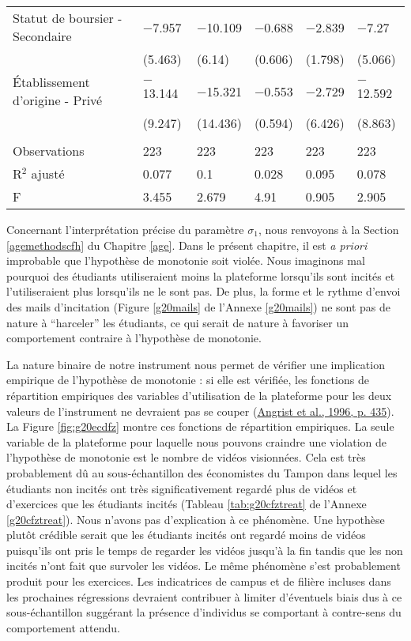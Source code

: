 \documentclass[
]{book}
\begin{document}
\begin{landscape}
\begin{ThreePartTable}
\begin{longtable}[t]{llllll}
Statut de boursier - Secondaire & $-$7.957 & $-$10.109 & $-$0.688 & $-$2.839 & $-$7.27\\
 & (5.463) & (6.14) & (0.606) & (1.798) & (5.066)\\
Établissement d'origine - Privé & $-$13.144 & $-$15.321 & $-$0.553 & $-$2.729 & $-$12.592\\
 & (9.247) & (14.436) & (0.594) & (6.426) & (8.863)\\
 &  &  &  &  & \\
Observations & 223 & 223 & 223 & 223 & 223\\
R$^2$ ajusté & 0.077 & 0.1 & 0.028 & 0.095 & 0.078\\
F & 3.455 & 2.679 & 4.91 & 0.905 & 2.905\\*
\end{longtable}
\end{ThreePartTable}
\endgroup{}
\end{landscape}

Concernant l'interprétation précise du paramètre \(\sigma_1\), nous renvoyons à la Section \ref{agemethodscfh} du Chapitre \ref{age}. Dans le présent chapitre, il est \emph{a priori} improbable que l'hypothèse de monotonie soit violée. Nous imaginons mal pourquoi des étudiants utiliseraient moins la plateforme lorsqu'ils sont incités et l'utiliseraient plus lorsqu'ils ne le sont pas. De plus, la forme et le rythme d'envoi des mails d'incitation (Figure \ref{g20mails} de l'Annexe \ref{g20mails}) ne sont pas de nature à ``harceler'' les étudiants, ce qui serait de nature à favoriser un comportement contraire à l'hypothèse de monotonie.

La nature binaire de notre instrument nous permet de vérifier une implication empirique de l'hypothèse de monotonie : si elle est vérifiée, les fonctions de répartition empiriques des variables d'utilisation de la plateforme pour les deux valeurs de l'instrument ne devraient pas se couper (\protect\hyperlink{ref-ANG:eal:96}{Angrist et al., 1996, p. 435}). La Figure \ref{fig:g20ecdfz} montre ces fonctions de répartition empiriques. La seule variable de la plateforme pour laquelle nous pouvons craindre une violation de l'hypothèse de monotonie est le nombre de vidéos visionnées. Cela est très probablement dû au sous-échantillon des économistes du Tampon dans lequel les étudiants non incités ont très significativement regardé plus de vidéos et d'exercices que les étudiants incités (Tableau \ref{tab:g20cfztreat} de l'Annexe \ref{g20cfztreat}). Nous n'avons pas d'explication à ce phénomène. Une hypothèse plutôt crédible serait que les étudiants incités ont regardé moins de vidéos puisqu'ils ont pris le temps de regarder les vidéos jusqu'à la fin tandis que les non incités n'ont fait que survoler les vidéos. Le même phénomène s'est probablement produit pour les exercices. Les indicatrices de campus et de filière incluses dans les prochaines régressions devraient contribuer à limiter d'éventuels biais dus à ce sous-échantillon suggérant la présence d'individus se comportant à contre-sens du comportement attendu.
\end{document}
